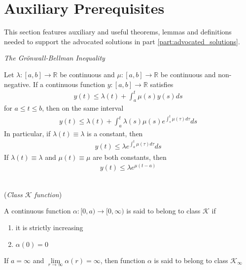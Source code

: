 \section{Auxiliary Prerequisites}

This section features auxiliary and useful theorems, lemmas and definitions
needed to support the advocated solutions in part
\ref{part:advocated_solutions}.

  \begin{lemma} \cite{khalil_nonlinear_systems} \textit{The Gr\"{o}nwall-Bellman Inequality}
    \label{lemma:bellman_inequality}

    Let $\lambda : [a,b] \to \mathbb{R}$ be continuous and
    $\mu : [a,b] \to \mathbb{R}$ be continuous and non-negative. If a
    continuous function $y : [a,b] \to \mathbb{R}$ satisfies
    \begin{align}
      y(t) \leq \lambda(t) + \int_a^t \mu(s) y(s) ds
    \end{align}
    for $a \leq t \leq b$, then on the same interval
    \begin{align}
      y(t) \leq \lambda(t) + \int_a^t \lambda(s) \mu(s) e^{\int_s^t \mu(\tau)d\tau} ds
    \end{align}
    In particular, if $\lambda(t) \equiv \lambda$ is a constant, then
    \begin{align}
      y(t) \leq \lambda e^{\int_a^t \mu(\tau)d\tau} ds
    \end{align}
    If $\lambda(t) \equiv \lambda$ and $\mu(t) \equiv \mu$ are both constants,
    then
    \begin{align}
      y(t) \leq \lambda e^{\mu (t - a)}
    \end{align}
    \\[2.5ex]
  \end{lemma}

\begin{definition}\cite{khalil_nonlinear_systems} (\textit{Class $\mathcal{K}$ function})
\label{def:k_class}

  A continuous function $\alpha : [0, a) \to [0, \infty)$
  is said to belong to class $\mathcal{K}$ if
  \begin{enumerate}
    \item it is strictly increasing
    \item $\alpha (0) = 0$
  \end{enumerate}
  If $a = \infty$ and $\lim\limits_{r \to \infty} \alpha(r) = \infty$, then function
  $\alpha$ is said to belong to class $\mathcal{K}_{\infty}$
\\[2.5ex]
\end{definition}


